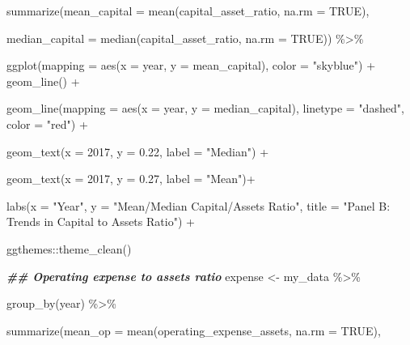 \documentclass[a4paper,nobind]{templates/ociamthesis}
\newenvironment{Shaded}{\begin{snugshade}}{\end{snugshade}}
\newcommand{\AttributeTok}[1]{\textcolor[rgb]{0.77,0.63,0.00}{#1}}
\newcommand{\ConstantTok}[1]{\textcolor[rgb]{0.00,0.00,0.00}{#1}}
\newcommand{\DecValTok}[1]{\textcolor[rgb]{0.00,0.00,0.81}{#1}}
\newcommand{\DocumentationTok}[1]{\textcolor[rgb]{0.56,0.35,0.01}{\textbf{\textit{#1}}}}
\newcommand{\FloatTok}[1]{\textcolor[rgb]{0.00,0.00,0.81}{#1}}
\newcommand{\FunctionTok}[1]{\textcolor[rgb]{0.00,0.00,0.00}{#1}}
\newcommand{\NormalTok}[1]{#1}
\newcommand{\OtherTok}[1]{\textcolor[rgb]{0.56,0.35,0.01}{#1}}
\newcommand{\SpecialCharTok}[1]{\textcolor[rgb]{0.00,0.00,0.00}{#1}}
\newcommand{\StringTok}[1]{\textcolor[rgb]{0.31,0.60,0.02}{#1}}
\renewenvironment{Shaded}
{
  \vspace{10pt}%
  \begin{snugshade}%
}{%
  \end{snugshade}%
  \vspace{8pt}%
}
\begin{document}
\begin{Shaded}
\begin{Highlighting}[]
  \FunctionTok{summarize}\NormalTok{(}\AttributeTok{mean\_capital =} \FunctionTok{mean}\NormalTok{(capital\_asset\_ratio, }\AttributeTok{na.rm =} \ConstantTok{TRUE}\NormalTok{), }
                               
  \AttributeTok{median\_capital =} \FunctionTok{median}\NormalTok{(capital\_asset\_ratio, }\AttributeTok{na.rm =} \ConstantTok{TRUE}\NormalTok{)) }\SpecialCharTok{\%\textgreater{}\%} 
  
  \FunctionTok{ggplot}\NormalTok{(}\AttributeTok{mapping =} \FunctionTok{aes}\NormalTok{(}\AttributeTok{x =}\NormalTok{ year, }\AttributeTok{y =}\NormalTok{ mean\_capital), }\AttributeTok{color =} \StringTok{"skyblue"}\NormalTok{) }\SpecialCharTok{+} \FunctionTok{geom\_line}\NormalTok{() }\SpecialCharTok{+}
  
  \FunctionTok{geom\_line}\NormalTok{(}\AttributeTok{mapping =} \FunctionTok{aes}\NormalTok{(}\AttributeTok{x =}\NormalTok{ year, }\AttributeTok{y =}\NormalTok{ median\_capital), }\AttributeTok{linetype =} \StringTok{"dashed"}\NormalTok{, }\AttributeTok{color =} \StringTok{"red"}\NormalTok{) }\SpecialCharTok{+}
  
  \FunctionTok{geom\_text}\NormalTok{(}\AttributeTok{x =} \DecValTok{2017}\NormalTok{, }\AttributeTok{y =} \FloatTok{0.22}\NormalTok{, }\AttributeTok{label =} \StringTok{"Median"}\NormalTok{) }\SpecialCharTok{+} 
  
  \FunctionTok{geom\_text}\NormalTok{(}\AttributeTok{x =} \DecValTok{2017}\NormalTok{, }\AttributeTok{y =} \FloatTok{0.27}\NormalTok{, }\AttributeTok{label =} \StringTok{"Mean"}\NormalTok{)}\SpecialCharTok{+}
  
  \FunctionTok{labs}\NormalTok{(}\AttributeTok{x =} \StringTok{"Year"}\NormalTok{, }\AttributeTok{y =} \StringTok{"Mean/Median Capital/Assets Ratio"}\NormalTok{, }\AttributeTok{title =} \StringTok{"Panel B: Trends in Capital to Assets Ratio"}\NormalTok{) }\SpecialCharTok{+} 
  
\NormalTok{  ggthemes}\SpecialCharTok{::}\FunctionTok{theme\_clean}\NormalTok{()}

\DocumentationTok{\#\# Operating expense to assets ratio}
\NormalTok{expense }\OtherTok{\textless{}{-}}\NormalTok{ my\_data }\SpecialCharTok{\%\textgreater{}\%} 
  
  \FunctionTok{group\_by}\NormalTok{(year) }\SpecialCharTok{\%\textgreater{}\%} 
  
  \FunctionTok{summarize}\NormalTok{(}\AttributeTok{mean\_op =} \FunctionTok{mean}\NormalTok{(operating\_expense\_assets, }\AttributeTok{na.rm =} \ConstantTok{TRUE}\NormalTok{), }
                               

\end{Highlighting}
\end{Shaded}
\end{document}

